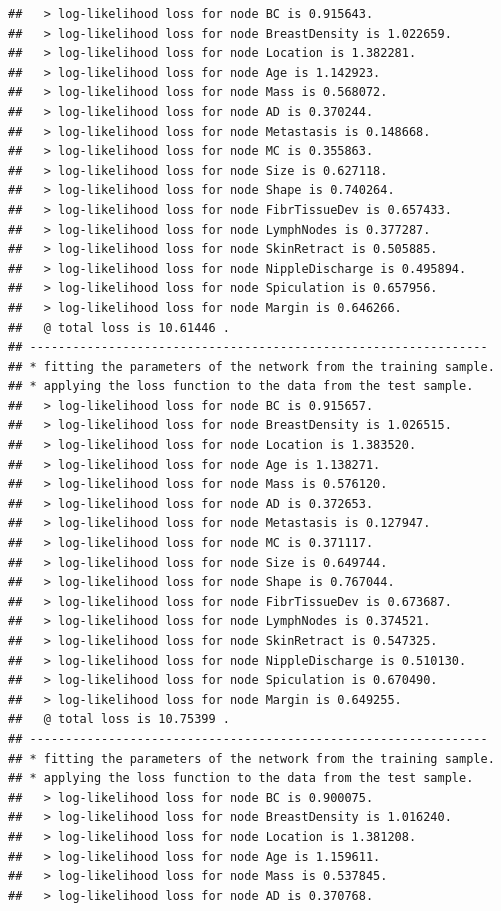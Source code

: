 \documentclass[]{article}
\begin{document}
\begin{verbatim}
##   > log-likelihood loss for node BC is 0.915643.
##   > log-likelihood loss for node BreastDensity is 1.022659.
##   > log-likelihood loss for node Location is 1.382281.
##   > log-likelihood loss for node Age is 1.142923.
##   > log-likelihood loss for node Mass is 0.568072.
##   > log-likelihood loss for node AD is 0.370244.
##   > log-likelihood loss for node Metastasis is 0.148668.
##   > log-likelihood loss for node MC is 0.355863.
##   > log-likelihood loss for node Size is 0.627118.
##   > log-likelihood loss for node Shape is 0.740264.
##   > log-likelihood loss for node FibrTissueDev is 0.657433.
##   > log-likelihood loss for node LymphNodes is 0.377287.
##   > log-likelihood loss for node SkinRetract is 0.505885.
##   > log-likelihood loss for node NippleDischarge is 0.495894.
##   > log-likelihood loss for node Spiculation is 0.657956.
##   > log-likelihood loss for node Margin is 0.646266.
##   @ total loss is 10.61446 .
## ----------------------------------------------------------------
## * fitting the parameters of the network from the training sample.
## * applying the loss function to the data from the test sample.
##   > log-likelihood loss for node BC is 0.915657.
##   > log-likelihood loss for node BreastDensity is 1.026515.
##   > log-likelihood loss for node Location is 1.383520.
##   > log-likelihood loss for node Age is 1.138271.
##   > log-likelihood loss for node Mass is 0.576120.
##   > log-likelihood loss for node AD is 0.372653.
##   > log-likelihood loss for node Metastasis is 0.127947.
##   > log-likelihood loss for node MC is 0.371117.
##   > log-likelihood loss for node Size is 0.649744.
##   > log-likelihood loss for node Shape is 0.767044.
##   > log-likelihood loss for node FibrTissueDev is 0.673687.
##   > log-likelihood loss for node LymphNodes is 0.374521.
##   > log-likelihood loss for node SkinRetract is 0.547325.
##   > log-likelihood loss for node NippleDischarge is 0.510130.
##   > log-likelihood loss for node Spiculation is 0.670490.
##   > log-likelihood loss for node Margin is 0.649255.
##   @ total loss is 10.75399 .
## ----------------------------------------------------------------
## * fitting the parameters of the network from the training sample.
## * applying the loss function to the data from the test sample.
##   > log-likelihood loss for node BC is 0.900075.
##   > log-likelihood loss for node BreastDensity is 1.016240.
##   > log-likelihood loss for node Location is 1.381208.
##   > log-likelihood loss for node Age is 1.159611.
##   > log-likelihood loss for node Mass is 0.537845.
##   > log-likelihood loss for node AD is 0.370768.

\end{verbatim}
\end{document}
